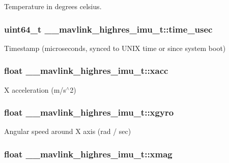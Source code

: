 Temperature in degrees celsius. 

\hypertarget{struct____mavlink__highres__imu__t_aaf1a08b7dcf5ed9ca8ce6f66c392d678}{
\subsubsection[{time\+\_\+usec}]{\setlength{\rightskip}{0pt plus 5cm}uint64\+\_\+t \+\_\+\+\_\+mavlink\+\_\+highres\+\_\+imu\+\_\+t\+::time\+\_\+usec}}\label{struct____mavlink__highres__imu__t_aaf1a08b7dcf5ed9ca8ce6f66c392d678}


Timestamp (microseconds, synced to U\+N\+I\+X time or since system boot) 

\hypertarget{struct____mavlink__highres__imu__t_ace5e765b886ddee9ea50983177bea172}{
\subsubsection[{xacc}]{\setlength{\rightskip}{0pt plus 5cm}float \+\_\+\+\_\+mavlink\+\_\+highres\+\_\+imu\+\_\+t\+::xacc}}\label{struct____mavlink__highres__imu__t_ace5e765b886ddee9ea50983177bea172}


X acceleration (m/s$^\wedge$2) 

\hypertarget{struct____mavlink__highres__imu__t_ae736b5fdd1185a4ec6c2947d652778e1}{
\subsubsection[{xgyro}]{\setlength{\rightskip}{0pt plus 5cm}float \+\_\+\+\_\+mavlink\+\_\+highres\+\_\+imu\+\_\+t\+::xgyro}}\label{struct____mavlink__highres__imu__t_ae736b5fdd1185a4ec6c2947d652778e1}


Angular speed around X axis (rad / sec) 

\hypertarget{struct____mavlink__highres__imu__t_a82d9c25f53b9ee64f48c99f45eaead70}{
\subsubsection[{xmag}]{\setlength{\rightskip}{0pt plus 5cm}float \+\_\+\+\_\+mavlink\+\_\+highres\+\_\+imu\+\_\+t\+::xmag}}\label{struct____mavlink__highres__imu__t_a82d9c25f53b9ee64f48c99f45eaead70}


